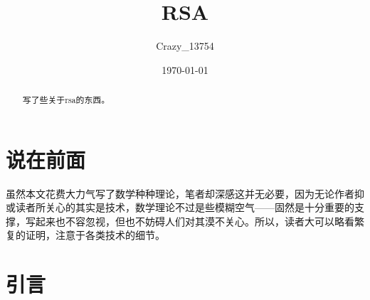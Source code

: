 \documentclass[a4paper]{article}         %
\title{\heiti\zihao{2} RSA}
\author{\songti Crazy\_13754}
\date{\today}
\newcommand{\upcite}[1]{\textsuperscript{\cite{#1}}} %
\begin{document}

\maketitle
\begin{abstract}
	写了些关于rsa的东西。
\end{abstract}
\tableofcontents
\section{说在前面}

虽然本文花费大力气写了数学种种理论，笔者却深感这并无必要，因为无论作者抑或读者所关心的其实是技术，数学理论不过是些模糊空气——固然是十分重要的支撑，写起来也不容忽视，但也不妨碍人们对其漠不关心。所以，读者大可以略看繁复的证明，注意于各类技术的细节。

\section[引言]{引言}




\end{document}
